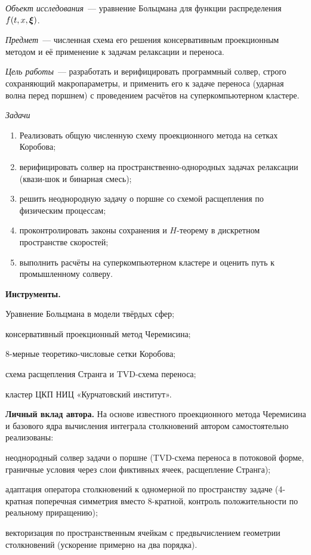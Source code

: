 \emph{Объект исследования}~--- уравнение Больцмана для функции распределения $f(t,x,\boldsymbol{\xi})$.

\emph{Предмет}~--- численная схема его решения консервативным проекционным методом и её применение к задачам релаксации
и переноса.

\emph{Цель работы}~--- разработать и верифицировать программный солвер, строго сохраняющий макропараметры, и применить
его к задаче переноса (ударная волна перед поршнем) с проведением расчётов на суперкомпьютерном кластере.

\emph{Задачи}
\begin{enumerate}
  \item Реализовать общую численную схему проекционного метода на сетках Коробова;
  \item верифицировать солвер на пространственно-однородных задачах релаксации (квази-шок и бинарная смесь);
  \item решить неоднородную задачу о поршне со схемой расщепления по физическим процессам;
  \item проконтролировать законы сохранения и $H$-теорему в дискретном пространстве скоростей;
  \item выполнить расчёты на суперкомпьютерном кластере и оценить путь к промышленному солверу.
\end{enumerate}

\textbf{Инструменты.}

Уравнение Больцмана в модели твёрдых сфер;

консервативный проекционный метод Черемисина;

8-мерные теоретико-числовые сетки Коробова;

схема расщепления Странга и TVD-схема переноса;

кластер ЦКП НИЦ «Курчатовский институт».

\textbf{Личный вклад автора.}
На основе известного проекционного метода Черемисина и базового ядра вычисления интеграла столкновений автором
самостоятельно реализованы:

неоднородный солвер задачи о поршне (TVD-схема переноса в потоковой форме, граничные условия через слои фиктивных ячеек,
расщепление Странга);

адаптация оператора столкновений к одномерной по пространству задаче (4-кратная поперечная симметрия вместо 8-кратной,
контроль положительности по реальному приращению);

векторизация по пространственным ячейкам с предвычислением геометрии столкновений (ускорение примерно на два порядка).

